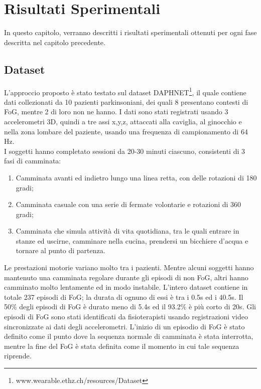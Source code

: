 
\chapter[Risultati Sperimentali]{Risultati Sperimentali}\label{chap6:result}
In questo capitolo, verranno descritti i risultati sperimentali ottenuti per ogni fase descritta nel capitolo precedente.

\section{Dataset}
L'approccio proposto è stato testato sul dataset DAPHNET\footnote{www.wearable.ethz.ch/resources/Dataset}, il quale contiene dati collezionati da 10 pazienti parkinsoniani, dei quali 8 presentano contesti di FoG, mentre 2 di loro non ne hanno. I dati sono stati registrati usando 3 accelerometri 3D, quindi a tre assi x,y,z, attaccati alla caviglia, al ginocchio e nella zona lombare del paziente, usando una frequenza di campionamento di 64 Hz.\\
I soggetti hanno completato sessioni da 20-30 minuti ciascuno, consistenti di 3 fasi di camminata:
\begin{enumerate}
	\item Camminata avanti ed indietro lungo una linea retta, con delle rotazioni di 180 gradi;
	\item Camminata casuale con una serie di fermate volontarie e rotazioni di 360 gradi;
	\item Camminata che simula attività di vita quotidiana, tra le quali entrare in stanze ed uscirne, camminare nella cucina, prendersi un bicchiere d'acqua e tornare al punto di partenza.
\end{enumerate}
Le prestazioni motorie variano molto tra i pazienti. Mentre alcuni soggetti hanno mantenuto una camminata regolare durante gli episodi di non FoG, altri hanno camminato molto lentamente ed in modo instabile. L'intero dataset contiene in totale 237 episodi di FoG; la durata di ognuno di essi è tra i 0.5s ed i 40.5s. Il 50\% degli episodi di FoG è durato meno di 5.4s ed il 93.2\% è più corto di 20s. Gli episodi di FoG sono stati identificati da fisioterapisti usando registrazioni video sincronizzate ai dati degli accelerometri. L'inizio di un episodio di FoG è stato definito come il punto dove la sequenza normale di camminata è stata interrotta, mentre la fine del FoG è stata definita come il momento in cui tale sequenza riprende.

